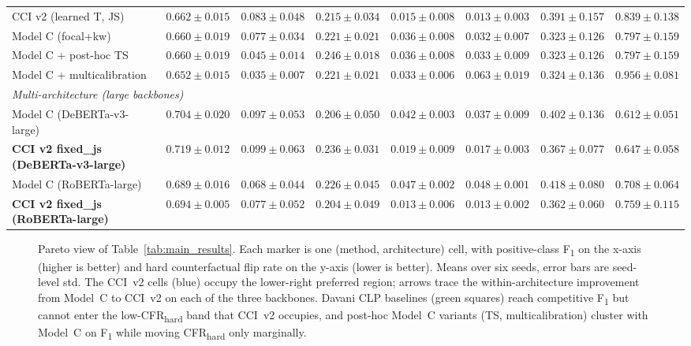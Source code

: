 \begin{table}[t]
\begin{tabular}{@{}lccccccc@{}}
CCI v2 (learned T, JS) & $0.662 \pm 0.015$ & $\mathbf{0.083 \pm 0.048}$ & $0.215 \pm 0.034$ & $\mathbf{0.015 \pm 0.008}$ & $\mathbf{0.013 \pm 0.003}$ & $0.391 \pm 0.157$ & $0.839 \pm 0.138$ \\
Model C (focal+kw)              & $0.660 \pm 0.019$ & $0.077 \pm 0.034$ & $0.221 \pm 0.021$ & $0.036 \pm 0.008$\textbf{\*} & $0.032 \pm 0.007$\textbf{\*} & $\mathbf{0.323 \pm 0.126}$ & $0.797 \pm 0.159$ \\
Model C + post-hoc TS           & $0.660 \pm 0.019$ & $0.045 \pm 0.014$ & $0.246 \pm 0.018$ & $0.036 \pm 0.008$\textbf{\*} & $0.033 \pm 0.009$\textbf{\*} & $\mathbf{0.323 \pm 0.126}$ & $0.797 \pm 0.159$ \\
Model C + multicalibration      & $0.652 \pm 0.015$ & $\mathbf{0.035 \pm 0.007}$ & $0.221 \pm 0.021$ & $0.033 \pm 0.006$\textbf{\*} & $0.063 \pm 0.019$\textbf{\*} & $0.324 \pm 0.136$ & $0.956 \pm 0.081$ \\
\midrule
\multicolumn{8}{l}{\emph{Multi-architecture (large backbones)}} \\
Model C (DeBERTa-v3-large)      & $0.704 \pm 0.020$ & $0.097 \pm 0.053$ & $0.206 \pm 0.050$ & $0.042 \pm 0.003$ & $0.037 \pm 0.009$ & $0.402 \pm 0.136$ & $\mathbf{0.612 \pm 0.051}$ \\
\textbf{CCI v2 fixed\_js (DeBERTa-v3-large)} & $\mathbf{0.719 \pm 0.012}$ & $0.099 \pm 0.063$ & $0.236 \pm 0.031$ & $0.019 \pm 0.009$ & $0.017 \pm 0.003$ & $0.367 \pm 0.077$ & $0.647 \pm 0.058$ \\
Model C (RoBERTa-large)         & $0.689 \pm 0.016$ & $0.068 \pm 0.044$ & $0.226 \pm 0.045$ & $0.047 \pm 0.002$ & $0.048 \pm 0.001$ & $0.418 \pm 0.080$ & $0.708 \pm 0.064$ \\
\textbf{CCI v2 fixed\_js (RoBERTa-large)} & $0.694 \pm 0.005$ & $0.077 \pm 0.052$ & $\mathbf{0.204 \pm 0.049}$ & $\mathbf{0.013 \pm 0.006}$ & $0.013 \pm 0.002$ & $\mathbf{0.362 \pm 0.060}$ & $0.759 \pm 0.115$ \\
\bottomrule
\end{tabular}
\end{table}

\begin{figure}[h]
\centering
\caption{Pareto view of Table~\ref{tab:main_results}. Each marker is one (method, architecture) cell, with positive-class F\textsubscript{1} on the x-axis (higher is better) and hard counterfactual flip rate on the y-axis (lower is better). Means over six seeds, error bars are seed-level std. The CCI~v2 cells (blue) occupy the lower-right preferred region; arrows trace the within-architecture improvement from Model~C to CCI~v2 on each of the three backbones. Davani CLP baselines (green squares) reach competitive F\textsubscript{1} but cannot enter the low-CFR\textsubscript{hard} band that CCI~v2 occupies, and post-hoc Model~C variants (TS, multicalibration) cluster with Model~C on F\textsubscript{1} while moving CFR\textsubscript{hard} only marginally.}
\label{fig:pareto_main}
\end{figure}

